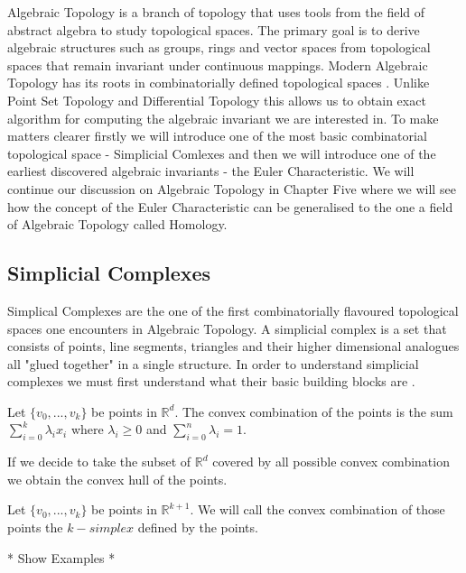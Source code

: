 Algebraic Topology is a branch of topology that uses tools from the field of abstract algebra to study topological spaces. The primary goal is to derive algebraic structures such as groups, rings and vector spaces from topological spaces that remain invariant under continuous mappings. Modern Algebraic Topology has its roots in combinatorially defined topological spaces \cite{comb-alg-topo}. Unlike Point Set Topology and Differential Topology this allows us to obtain exact algorithm for computing the algebraic invariant we are interested in. To make matters clearer firstly we will introduce one of the most basic combinatorial topological space - Simplicial Comlexes and then we will introduce one of the earliest discovered algebraic invariants - the Euler Characteristic. We will continue our discussion on Algebraic Topology in Chapter Five where we will see how the concept of the Euler Characteristic can be generalised to the one a field of Algebraic Topology called Homology.

\subsection{Simplicial Complexes}

Simplical Complexes are the one of the first combinatorially flavoured topological spaces one encounters in Algebraic Topology. A simplicial complex is a set that consists of points, line segments, triangles and their higher dimensional analogues all "glued together" in a single structure. In order to understand simplicial complexes we must first understand what their basic building blocks are \cite{comp-topo}.

\begin{defn} Let $\{v_0, ..., v_k\}$ be points in $\mathbb{R}^d$. The convex combination of the points is the sum $\sum_{i=0}^k{\lambda_ix_i}$ where $\lambda_i \ge 0$ and $\sum_{i=0}^n{\lambda_i} = 1$.  \end{defn}

If we decide to take the subset of $\mathbb{R}^d$ covered by all possible convex combination we obtain the convex hull of the points.

\begin{defn} Let $\{v_0, ..., v_k\}$ be points in $\mathbb{R}^{k+1}$. We will call the convex combination of those points the $k-simplex$ defined by the points.  \end{defn}

* Show Examples *

